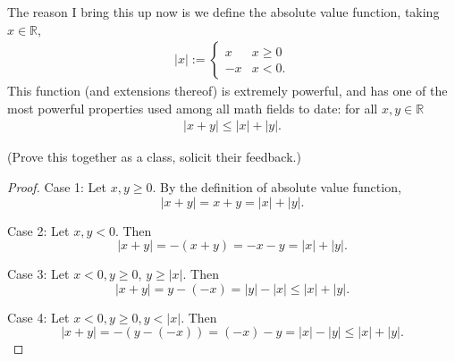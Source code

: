\documentclass{ximera}
\begin{document}
The reason I bring this up now is we define the absolute value function, taking $x \in \mathbb{R}$,
\begin{align}
    |x| := \begin{cases}x & x\geq 0 \\ -x & x < 0. \end{cases}
\end{align}
This function (and extensions thereof) is extremely powerful, and has one of the most powerful properties used among all math fields to date: for all $x, y \in \mathbb{R}$
\begin{align}
    |x+y| \leq |x| + |y|.
\end{align}

(Prove this together as a class, solicit their feedback.)
\begin{proof}
    Case 1: Let $x, y \geq 0$.  By the definition of absolute value function,
    \[|x+ y| = x+y = |x| + |y|.\]

    Case 2: Let $x,y < 0$.  Then
    \[|x+y| = -(x+y) = -x -y = |x| + |y|.\]

    Case 3: Let $x < 0, y \geq 0$, $y \geq |x|$. Then 
    \[|x+y| = y- (-x) = |y| - |x| \leq |x| + |y|.\]

    Case 4: Let $x< 0, y\geq0, y  < |x|$. 
    Then
    \[|x+y| = -(y-(-x)) = (-x)-y = |x| - |y| \leq |x| + |y|. \]
\end{proof}


\end{document}
